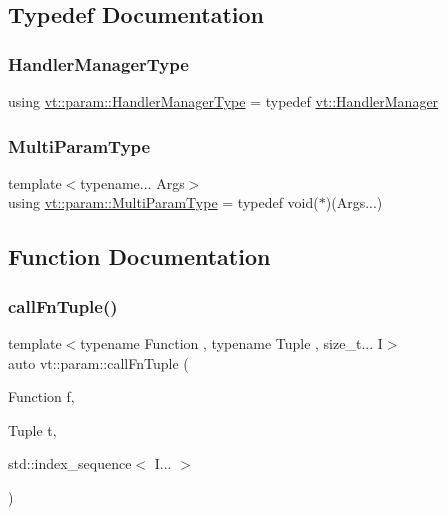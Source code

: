 \subsection{Typedef Documentation}
\mbox{\label{namespacevt_1_1param_ad9561687e11201a35ed8aba0b666c0b4}} 
\subsubsection{\texorpdfstring{Handler\+Manager\+Type}{HandlerManagerType}}
{\footnotesize\ttfamily using \hyperlink{namespacevt_1_1param_ad9561687e11201a35ed8aba0b666c0b4}{vt\+::param\+::\+Handler\+Manager\+Type} = typedef \hyperlink{structvt_1_1_handler_manager}{vt\+::\+Handler\+Manager}}

\mbox{\label{namespacevt_1_1param_ada9e92f75ab7e859947a8ffe5bae6c5b}} 
\subsubsection{\texorpdfstring{Multi\+Param\+Type}{MultiParamType}}
{\footnotesize\ttfamily template$<$typename... Args$>$ \\
using \hyperlink{namespacevt_1_1param_ada9e92f75ab7e859947a8ffe5bae6c5b}{vt\+::param\+::\+Multi\+Param\+Type} = typedef void($\ast$)(Args...)}



\subsection{Function Documentation}
\mbox{\label{namespacevt_1_1param_abc9c93cc76336669a28b64f562dd78a3}} 
\subsubsection{\texorpdfstring{call\+Fn\+Tuple()}{callFnTuple()}}
{\footnotesize\ttfamily template$<$typename Function , typename Tuple , size\+\_\+t... I$>$ \\
auto vt\+::param\+::call\+Fn\+Tuple (\begin{DoxyParamCaption}\item[{Function}]{f,  }\item[{Tuple}]{t,  }\item[{std\+::index\+\_\+sequence$<$ I... $>$}]{ }\end{DoxyParamCaption})}

